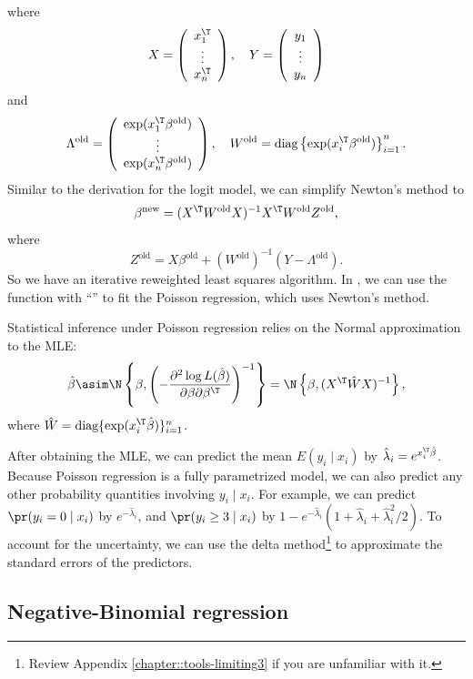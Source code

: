 where 
\[
X=\left(\begin{array}{c}
x_{1}^{\T}\\
\vdots\\
x_{n}^{\T}
\end{array}\right),\quad Y=\left(\begin{array}{c}
y_{1}\\
\vdots\\
y_{n}
\end{array}\right)
\]
and
\[
\Lambda^{\text{old}}=\left(\begin{array}{c}
\exp(x_{1}^{\T}\beta^{\text{old}})\\
\vdots\\
\exp(x_{n}^{\T}\beta^{\text{old}})
\end{array}\right),\quad W^{\text{old}}=\text{diag}\left\{ \exp(x_{i}^{\T}\beta^{\text{old}})\right\} _{i=1}^{n}.
\]
Similar to the derivation for the logit model, we can simplify Newton's
method to
\[
\beta^{\text{new}}=(X^{\T}W^{\text{old}}X)^{-1}X^{\T}W^{\text{old}}Z^{\text{old}},
\]
where 
\[
Z^{\text{old}}=X\beta^{\text{old}}+(W^{\text{old}})^{-1}(Y-\Lambda^{\text{old}}).
\]
So we have an iterative reweighted least squares algorithm. In , we can use the  function with ``'' to fit the Poisson regression, which uses Newton's method. 
 

Statistical inference under Poisson regression relies on the Normal approximation to the MLE: 
\[
\hat{\beta}\asim\N\left\{ \beta,\left(-\frac{\partial^{2}\log L(\hat{\beta})}{\partial\beta\partial\beta^{\T}}\right)^{-1}\right\} =\N\left\{ \beta,(X^{\T}\hat{W}X)^{-1}\right\} ,
\]
where $\hat{W}=\text{diag} \{ \exp(x_{i}^{\T}\hat{\beta}) \} _{i=1}^{n}$. 


After obtaining the MLE, we can predict the mean $E(y_i \mid x_i)$ by $ \hat{\lambda}_i =  e^{x_i^{\T} \hat{\beta}} $. Because Poisson regression is a fully parametrized model, we can also predict any other probability quantities involving $y_i \mid x_i$. For example, we can predict  $\pr(y_i = 0  \mid x_i)$ by $e^{- \hat{\lambda}_i }$, and $\pr(y_i \geq 3 \mid x_i) $ by $1 - e^{- \hat{\lambda}_i } (1 + \hat{\lambda}_i  + \hat{\lambda}_i ^2/2 )$. 
To account for the uncertainty, we can use the delta method\footnote{Review Appendix \ref{chapter::tools-limiting3} if you are unfamiliar with it.} to approximate the standard errors of the predictors. 



\subsection{Negative-Binomial regression}

